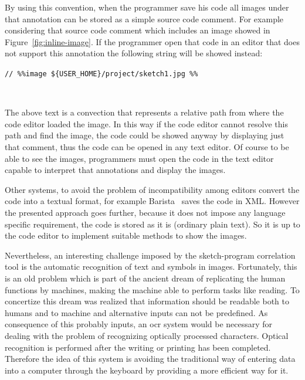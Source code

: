 By using this convention, when the programmer save his code all images under that annotation can be stored as a simple source code comment. For example considering that source code comment which includes an image showed in Figure~\ref{fig:inline-image}. If the programmer open that code in an editor that does not support this annotation the following string will be showed instead:

\begin{center}
\begin{minipage}[c]{.6\textwidth}
\texttt{// \%\%image \$\{USER\_HOME\}/project/sketch1.jpg \%\%}
\end{minipage} \\
\end{center}

The above text is a convection that represents a relative path from where the code editor loaded the image. In this way if the code editor cannot resolve this path and find the image, the code could be showed anyway by displaying just that comment, thus the code can be opened in any text editor. Of course to be able to see the images, programmers must open the code in the text editor capable to interpret that annotations and display the images. 

Other systems, to avoid the problem of incompatibility among editors convert the code into a textual format, for example Barista~\citep{ko2006barista} saves the code in XML. However the presented approach goes further, because it does not impose any language specific requirement, the code is stored as it is (ordinary plain text). So it is up to the code editor to implement suitable methods to show the images.

Nevertheless, an interesting challenge imposed by the sketch-program correlation tool is the automatic recognition of text and symbols in images. Fortunately, this is an old problem which is part of the ancient dream of replicating the human functions by machines, making the machine able to perform tasks like reading. To concertize this dream was realized that information should be readable both to humans and to machine and alternative inputs can not be predefined. As consequence of this probably inputs, an \gls{ocr} system would be necessary for dealing with the problem of recognizing optically processed characters. Optical recognition is performed after the writing or printing has been completed. Therefore the idea of this system is avoiding the traditional way of entering data into a computer through the keyboard by providing a more efficient way for it.

